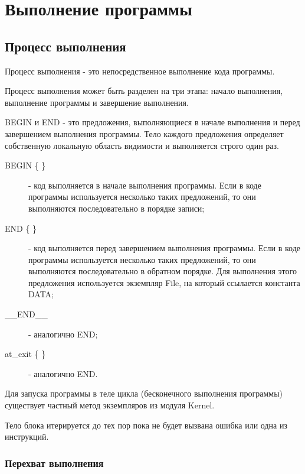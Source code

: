\chapter{Выполнение программы}

\section{Процесс выполнения}

Процесс выполнения - это непосредственное выполнение кода программы.

Процесс выполнения может быть разделен на три этапа: начало выполнения, выполнение программы и завершение выполнения.

BEGIN и END - это предложения, выполняющиеся в начале выполнения и перед завершением выполнения программы. Тело каждого предложения определяет собственную локальную область видимости и выполняется строго один раз.

\begin{description}
  \item[BEGIN \{ \}] - код выполняется в начале выполнения программы. Если в коде программы используется несколько таких предложений, то они выполняются последовательно в порядке записи;

  \item[END \{ \}] - код выполняется перед завершением выполнения программы. Если в коде программы используется несколько таких предложений, то они выполняются последовательно в обратном порядке. Для выполнения этого предложения используется экземпляр File, на который ссылается константа DATA;

  \item[__END__] - аналогично END; 

  \item[at_exit \{ \}] - аналогично END.
\end{description}

Для запуска программы в теле цикла (бесконечного выполнения программы) существует частный метод экземпляров из модуля Kernel.

\begin{methodlist}
  Тело блока итерируется до тех пор пока не будет вызвана ошибка  или одна из инструкций.
\end{methodlist}

\subsection{Перехват выполнения}

